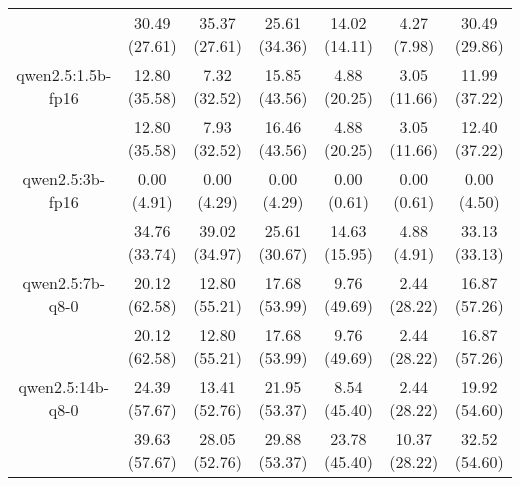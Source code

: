 \begin{table}[]
{\begin{tabular}{ccccccc}
        

        \multicolumn{1}{c|}{} & 30.49 (27.61) & 35.37 (27.61) & \multicolumn{1}{c|}{25.61 (34.36)} & 14.02 (14.11) & \multicolumn{1}{c|}{4.27 (7.98)} & 30.49 (29.86) \\
        \cline{1-7}
        

        \multicolumn{1}{c|}{qwen2.5:1.5b-fp16} & 12.80 (35.58) & 7.32 (32.52) & \multicolumn{1}{c|}{15.85 (43.56)} & 4.88 (20.25) & \multicolumn{1}{c|}{3.05 (11.66)} & 11.99 (37.22) \\
        
        

        \multicolumn{1}{c|}{} & 12.80 (35.58) & 7.93 (32.52) & \multicolumn{1}{c|}{16.46 (43.56)} & 4.88 (20.25) & \multicolumn{1}{c|}{3.05 (11.66)} & 12.40 (37.22) \\
        \cline{1-7}
        

        \multicolumn{1}{c|}{qwen2.5:3b-fp16} & 0.00 (4.91) & 0.00 (4.29) & \multicolumn{1}{c|}{0.00 (4.29)} & 0.00 (0.61) & \multicolumn{1}{c|}{0.00 (0.61)} & 0.00 (4.50) \\
        
        

        \multicolumn{1}{c|}{} & 34.76 (33.74) & 39.02 (34.97) & \multicolumn{1}{c|}{25.61 (30.67)} & 14.63 (15.95) & \multicolumn{1}{c|}{4.88 (4.91)} & 33.13 (33.13) \\
        \cline{1-7}
        

        \multicolumn{1}{c|}{qwen2.5:7b-q8-0} & 20.12 (62.58) & 12.80 (55.21) & \multicolumn{1}{c|}{17.68 (53.99)} & 9.76 (49.69) & \multicolumn{1}{c|}{2.44 (28.22)} & 16.87 (57.26) \\
        
        

        \multicolumn{1}{c|}{} & 20.12 (62.58) & 12.80 (55.21) & \multicolumn{1}{c|}{17.68 (53.99)} & 9.76 (49.69) & \multicolumn{1}{c|}{2.44 (28.22)} & 16.87 (57.26) \\
        \cline{1-7}
        

        \multicolumn{1}{c|}{qwen2.5:14b-q8-0} & 24.39 (57.67) & 13.41 (52.76) & \multicolumn{1}{c|}{21.95 (53.37)} & 8.54 (45.40) & \multicolumn{1}{c|}{2.44 (28.22)} & 19.92 (54.60) \\
        
        

        \multicolumn{1}{c|}{} & 39.63 (57.67) & 28.05 (52.76) & \multicolumn{1}{c|}{29.88 (53.37)} & 23.78 (45.40) & \multicolumn{1}{c|}{10.37 (28.22)} & 32.52 (54.60) \\
        \cline{1-7}
        


\end{tabular}}
\end{table}
